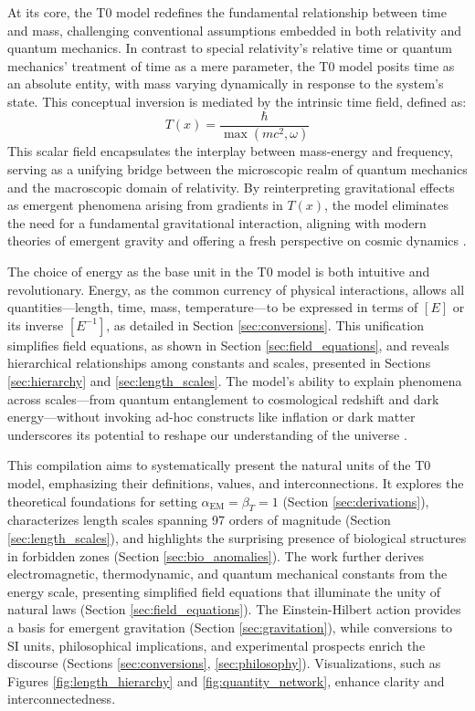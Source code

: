 \documentclass[12pt,a4paper]{article}
\newcommand{\Tfield}{T(x)}
\begin{document}
	At its core, the T0 model redefines the fundamental relationship between time and mass, challenging conventional assumptions embedded in both relativity and quantum mechanics. In contrast to special relativity’s relative time or quantum mechanics’ treatment of time as a mere parameter, the T0 model posits time as an absolute entity, with mass varying dynamically in response to the system’s state. This conceptual inversion is mediated by the intrinsic time field, defined as:
	\[
	\Tfield = \frac{\hbar}{\max(m c^2, \omega)}
	\]
	This scalar field encapsulates the interplay between mass-energy and frequency, serving as a unifying bridge between the microscopic realm of quantum mechanics and the macroscopic domain of relativity. By reinterpreting gravitational effects as emergent phenomena arising from gradients in \(\Tfield\), the model eliminates the need for a fundamental gravitational interaction, aligning with modern theories of emergent gravity and offering a fresh perspective on cosmic dynamics \cite{Verlinde2011, pascher_emergente_2025}.
	
	The choice of energy as the base unit in the T0 model is both intuitive and revolutionary. Energy, as the common currency of physical interactions, allows all quantities—length, time, mass, temperature—to be expressed in terms of \([E]\) or its inverse \([E^{-1}]\), as detailed in Section \ref{sec:conversions}. This unification simplifies field equations, as shown in Section \ref{sec:field_equations}, and reveals hierarchical relationships among constants and scales, presented in Sections \ref{sec:hierarchy} and \ref{sec:length_scales}. The model’s ability to explain phenomena across scales—from quantum entanglement to cosmological redshift and dark energy—without invoking ad-hoc constructs like inflation or dark matter underscores its potential to reshape our understanding of the universe \cite{pascher_energiedynamik_2025}.
	
	This compilation aims to systematically present the natural units of the T0 model, emphasizing their definitions, values, and interconnections. It explores the theoretical foundations for setting \(\alpha_{\text{EM}} = \beta_T = 1\) (Section \ref{sec:derivations}), characterizes length scales spanning 97 orders of magnitude (Section \ref{sec:length_scales}), and highlights the surprising presence of biological structures in forbidden zones (Section \ref{sec:bio_anomalies}). The work further derives electromagnetic, thermodynamic, and quantum mechanical constants from the energy scale, presenting simplified field equations that illuminate the unity of natural laws (Section \ref{sec:field_equations}). The Einstein-Hilbert action provides a basis for emergent gravitation (Section \ref{sec:gravitation}), while conversions to SI units, philosophical implications, and experimental prospects enrich the discourse (Sections \ref{sec:conversions}, \ref{sec:philosophy}). Visualizations, such as Figures \ref{fig:length_hierarchy} and \ref{fig:quantity_network}, enhance clarity and interconnectedness.
	
\end{document}
